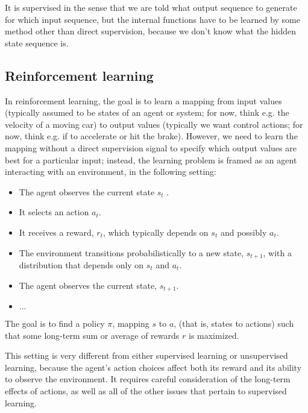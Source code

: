 It is supervised in the sense that we are told what output sequence to
generate for which input sequence, but the internal functions have to
be learned by some method other than direct supervision, because we
don't know what the hidden state sequence is.


\subsection{Reinforcement learning}

In reinforcement learning, the goal is to learn a mapping from input
values (typically assumed to be states of an agent or system; for now, think e.g. the velocity of a moving car)
to output values (typically we want control actions; for now, think e.g. if to accelerate or hit the brake). However, we need to learn the mapping without a direct supervision
signal to specify which output values are best for a particular
input; instead, the learning problem is framed as an agent interacting with an
environment, in the following setting:

\begin{itemize}

  \item The agent observes the current state ${s}_t$ .

  \item It selects an action ${a}_t.$
  \item It receives a reward, ${r}_{t}$, which typically depends on ${s}_{t}$
        and possibly ${a}_{t}$.
  \item The environment transitions probabilistically to a new state,
        ${s}_{t+1}$, with a distribution that depends only on ${s}_{t}$
        and ${a}_{t}$.
  \item The agent observes the current state, ${s}_{t+1}$.
  \item $\ldots$
\end{itemize}
The goal is to find a policy $\pi$, mapping $s$ to $a$, (that is,
states to actions) such that some long-term sum or average of rewards
$r$ is maximized.

This setting is very different from either supervised learning or
unsupervised learning, because the agent's action choices affect both
its reward and its ability to observe the environment.
It requires careful consideration of the long-term effects of actions,
as well as all of the other issues that pertain to supervised
learning.



